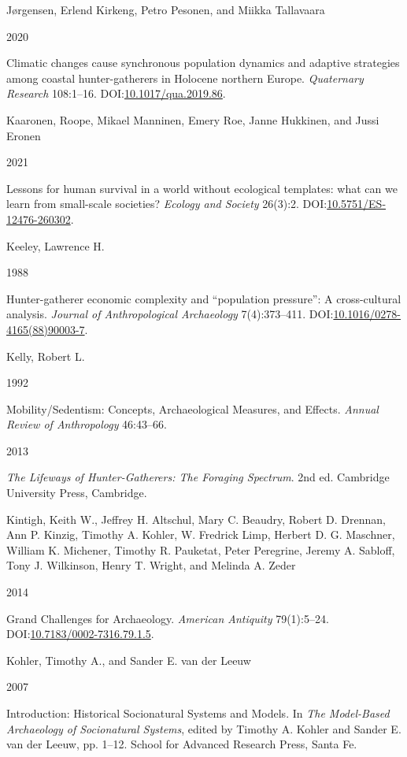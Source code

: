\documentclass[
  12pt,
  a4paper,
  oneside]{book}
\newlength{\cslhangindent}
\newlength{\csllabelwidth}
\newlength{\cslentryspacingunit} %
\newenvironment{CSLReferences}[2] %
 {%
  \setlength{\parindent}{0pt}
  \ifodd #1
  \let\oldpar\par
  \def\par{\hangindent=\cslhangindent\oldpar}
  \fi
  \setlength{\parskip}{#2\cslentryspacingunit}
 }%
 {}
\newcommand{\CSLBlock}[1]{#1\hfill\break}
\newcommand{\CSLLeftMargin}[1]{\parbox[t]{\csllabelwidth}{#1}}
\newcommand{\CSLRightInline}[1]{\parbox[t]{\linewidth - \csllabelwidth}{#1}\break}
\begin{document}
\begin{CSLReferences}{0}{0}
\leavevmode{}%
\CSLBlock{Jørgensen, Erlend Kirkeng, Petro Pesonen, and Miikka Tallavaara}
\CSLLeftMargin{ 2020}%
\CSLRightInline{{Climatic changes cause synchronous population dynamics and adaptive strategies among coastal hunter-gatherers in Holocene northern Europe}. \emph{Quaternary Research} 108:1--16. DOI:\href{https://doi.org/10.1017/qua.2019.86}{10.1017/qua.2019.86}.}

\leavevmode{}%
\CSLBlock{Kaaronen, Roope, Mikael Manninen, Emery Roe, Janne Hukkinen, and Jussi Eronen}
\CSLLeftMargin{ 2021}%
\CSLRightInline{Lessons for human survival in a world without ecological templates: what can we learn from small-scale societies? \emph{Ecology and Society} 26(3):2. DOI:\href{https://doi.org/10.5751/ES-12476-260302}{10.5751/ES-12476-260302}.}

\leavevmode{}%
\CSLBlock{Keeley, Lawrence H.}
\CSLLeftMargin{ 1988}%
\CSLRightInline{Hunter-gatherer economic complexity and {``population pressure''}: A cross-cultural analysis. \emph{Journal of Anthropological Archaeology} 7(4):373--411. DOI:\href{https://doi.org/10.1016/0278-4165(88)90003-7}{10.1016/0278-4165(88)90003-7}.}

\leavevmode{}%
\CSLBlock{Kelly, Robert L.}
\CSLLeftMargin{ 1992}%
\CSLRightInline{{Mobility/Sedentism: Concepts, Archaeological Measures, and Effects}. \emph{Annual Review of Anthropology} 46:43--66.}

\leavevmode{}%
\CSLLeftMargin{ 2013 }%
\CSLRightInline{\emph{{The Lifeways of Hunter-Gatherers: The Foraging Spectrum}}. 2nd ed. Cambridge University Press, Cambridge.}

\leavevmode{}%
\CSLBlock{Kintigh, Keith W., Jeffrey H. Altschul, Mary C. Beaudry, Robert D. Drennan, Ann P. Kinzig, Timothy A. Kohler, W. Fredrick Limp, Herbert D. G. Maschner, William K. Michener, Timothy R. Pauketat, Peter Peregrine, Jeremy A. Sabloff, Tony J. Wilkinson, Henry T. Wright, and Melinda A. Zeder}
\CSLLeftMargin{ 2014}%
\CSLRightInline{{Grand Challenges for Archaeology}. \emph{American Antiquity} 79(1):5--24. DOI:\href{https://doi.org/10.7183/0002-7316.79.1.5}{10.7183/0002-7316.79.1.5}.}

\leavevmode{}%
\CSLBlock{Kohler, Timothy A., and Sander E. van der Leeuw}
\CSLLeftMargin{ 2007}%
\CSLRightInline{{Introduction: Historical Socionatural Systems and Models}. In \emph{{The Model-Based Archaeology of Socionatural Systems}}, edited by Timothy A. Kohler and Sander E. van der Leeuw, pp. 1--12. School for Advanced Research Press, Santa Fe.}


\end{CSLReferences}
\end{document}

